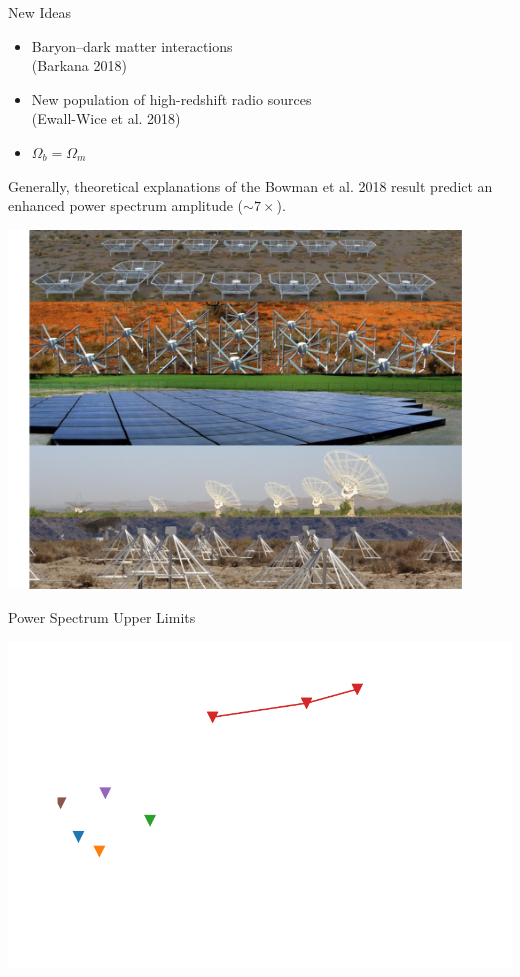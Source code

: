 \documentclass{beamer}
\begin{document}
\begin{frame}{New Ideas}
    \begin{itemize}[label=\textbullet]
        \item Baryon--dark matter interactions\\
            {\tiny (Barkana 2018)}
        \item New population of high-redshift radio sources\\
            {\tiny (Ewall-Wice et al. 2018)}
        \item $\Omega_b = \Omega_m$
    \end{itemize}
    Generally, theoretical explanations of the Bowman et al. 2018 result predict an enhanced power
    spectrum amplitude ($\sim 7\times$).
\end{frame}

\begin{frame}
    \begin{center}
        \includegraphics[width=0.9\textwidth]{figures/telescopes}
    \end{center}
\end{frame}

\begin{frame}{Power Spectrum Upper Limits}
    \begin{center}
        \includegraphics[height=0.75\textheight]{figures/power-spectrum-upper-limits/power-spectrum-upper-limits}
    \end{center}
\end{frame}
\end{document}
